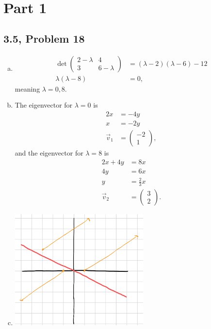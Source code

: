 \documentclass[10pt]{mypackage}
\begin{document}
\RaggedRight
\section{Part 1}%
\subsection{3.5, Problem 18}%
\begin{enumerate}[(a)]
  \item 
    \begin{align*}
      \det \begin{pmatrix}2-\lambda & 4 \\ 3 & 6-\lambda\end{pmatrix} &= \left(\lambda - 2\right)\left(\lambda - 6\right) - 12\\
      \lambda\left(\lambda - 8\right) &= 0,
    \end{align*}
    meaning $\lambda = 0,8$.
  \item The eigenvector for $\lambda = 0$ is
    \begin{align*}
      2x &= -4y\\
      x &= -2y\\
      \vec{v}_1 &= \begin{pmatrix}-2 \\ 1\end{pmatrix},
    \end{align*}
    and the eigenvector for $\lambda = 8$ is
    \begin{align*}
      2x + 4y &= 8x\\
      4y &= 6x\\
      y &= \frac{2}{3}x\\
      \vec{v}_2 &= \begin{pmatrix}3\\2\end{pmatrix}.
    \end{align*}
  \item 
    \begin{center}
      \includegraphics[width=7cm]{images/3_5_18c.png}

\end{center}
\end{enumerate}
\end{document}
